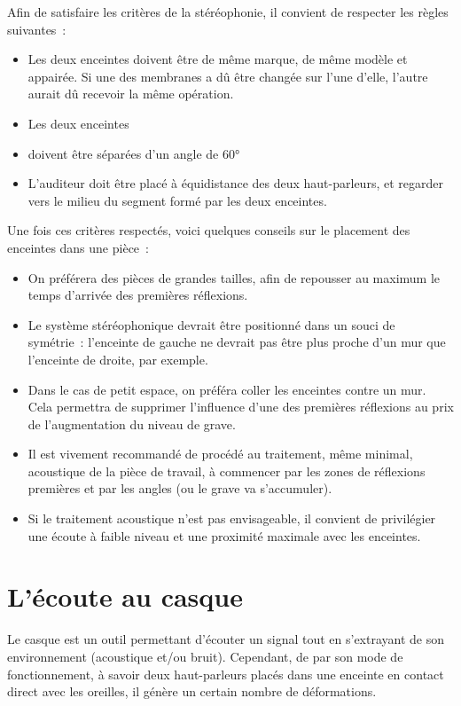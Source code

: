 \documentclass[
]{book}
\providecommand{\tightlist}{%
  \setlength{\itemsep}{0pt}\setlength{\parskip}{0pt}}
\begin{document}
Afin de satisfaire les critères de la stéréophonie, il convient de respecter les règles suivantes~:

\begin{itemize}
\tightlist
\item
  Les deux enceintes doivent être de même marque, de même modèle et appairée. Si une des membranes a dû être changée sur l'une d'elle, l'autre aurait dû recevoir la même opération.
\item
  Les deux enceintes
\item
  doivent être séparées d'un angle de 60°
\item
  L'auditeur doit être placé à équidistance des deux haut-parleurs, et regarder vers le milieu du segment formé par les deux enceintes.
\end{itemize}

Une fois ces critères respectés, voici quelques conseils sur le placement des enceintes dans une pièce~:

\begin{itemize}
\tightlist
\item
  On préférera des pièces de grandes tailles, afin de repousser au maximum le temps d'arrivée des premières réflexions.
\item
  Le système stéréophonique devrait être positionné dans un souci de symétrie~: l'enceinte de gauche ne devrait pas être plus proche d'un mur que l'enceinte de droite, par exemple.
\item
  Dans le cas de petit espace, on préféra coller les enceintes contre un mur. Cela permettra de supprimer l'influence d'une des premières réflexions au prix de l'augmentation du niveau de grave.
\item
  Il est vivement recommandé de procédé au traitement, même minimal, acoustique de la pièce de travail, à commencer par les zones de réflexions premières et par les angles (ou le grave va s'accumuler).
\item
  Si le traitement acoustique n'est pas envisageable, il convient de privilégier une écoute à faible niveau et une proximité maximale avec les enceintes.
\end{itemize}

\hypertarget{luxe9coute-au-casque}{%
\section{L'écoute au casque}\label{luxe9coute-au-casque}}

Le casque est un outil permettant d'écouter un signal tout en s'extrayant de son environnement (acoustique et/ou bruit). Cependant, de par son mode de fonctionnement, à savoir deux haut-parleurs placés dans une enceinte en contact direct avec les oreilles, il génère un certain nombre de déformations.
\end{document}
